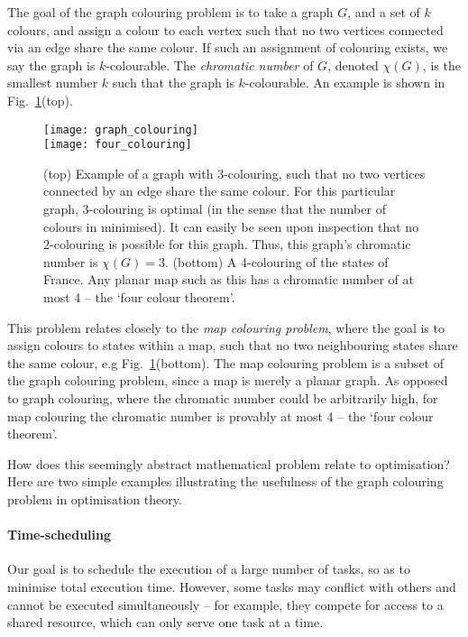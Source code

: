 The goal of the graph colouring problem is to take a graph $G$, and a set of $k$ colours, and assign a colour to each vertex such that no two vertices connected via an edge share the same colour. If such an assignment of colouring exists, we say the graph is $k$-colourable. The \textit{chromatic number} of $G$, denoted \mbox{$\chi(G)$}, is the smallest number $k$ such that the graph is $k$-colourable. An example is shown in Fig.~\ref{fig:graph_colouring}(top).

\begin{figure}[!htbp]
\texttt{[image: graph\_colouring]}\\
\texttt{[image: four\_colouring]}
\captionspacefig \caption{(top) Example of a graph with 3-colouring, such that no two vertices connected by an edge share the same colour. For this particular graph, 3-colouring is optimal (in the sense that the number of colours in minimised). It can easily be seen upon inspection that no 2-colouring is possible for this graph. Thus, this graph's chromatic number is \mbox{$\chi(G)=3$}. (bottom) A 4-colouring of the states of France. Any planar map such as this has a chromatic number of at most 4 -- the `four colour theorem'.}\label{fig:graph_colouring}	
\end{figure}

This problem relates closely to the \textit{map colouring problem}, where the goal is to assign colours to states within a map, such that no two neighbouring states share the same colour, e.g Fig.~\ref{fig:graph_colouring}(bottom). The map colouring problem is a subset of the graph colouring problem, since a map is merely a planar graph. As opposed to graph colouring, where the chromatic number could be arbitrarily high, for map colouring the chromatic number is provably at most 4 -- the `four colour theorem'.

How does this seemingly abstract mathematical problem relate to optimisation? Here are two simple examples illustrating the usefulness of the graph colouring problem in optimisation theory.

\paragraph{Time-scheduling}

Our goal is to schedule the execution of a large number of tasks, so as to minimise total execution time. However, some tasks may conflict with others and cannot be executed simultaneously -- for example, they compete for access to a shared resource, which can only serve one task at a time.

